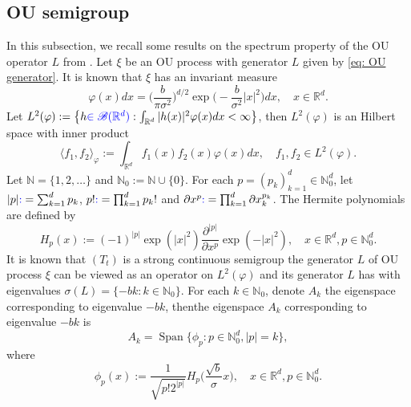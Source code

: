 \documentclass[12pt,oneside,english]{amsart}
\theoremstyle{plain}
\theoremstyle{definition}
\numberwithin{equation}{section}
\newcommand{\added}[1]{{\color{blue}#1}}\newcommand{\deleted}[1]{{\color{red}#1}}
\begin{document}
\subsection{OU semigroup}
    In this subsection, we recall some results on the spectrum property of the OU operator $L$ from \cite{GD}.
    Let $\xi$ be an OU process with generator $L$ given by \eqref{eq: OU generator}.
    It is known that $\xi$ has an invariant measure
\begin{equation}
\label{invariantdensity}
    \varphi(x)dx
    =\Big (\frac{b}{\pi \sigma^2}\Big )^{d/2}\exp \Big(-\frac{b}{\sigma^2}|x|^2 \Big)dx,
    \quad x\in \mathbb{R}^d.
\end{equation}
    Let $L^2(\varphi):= \left\{ h \added{ \in \mathscr B(\mathbb R^d)}: \int_{\mathbb{R}^d} |h(x)|^2 \varphi(x) dx < \infty \right\}$, then $L^2(\varphi)$ is an Hilbert space with inner product
\begin{equation}
    \langle f_1, f_2 \rangle_{\varphi}
    := \int_{\mathbb{R}^d}f_1(x)f_2(x)\varphi(x) dx, \quad f_1,f_2 \in L^2(\varphi).
\end{equation}
    \added{ Let $\mathbb N = \{1,2,\dots\}$ and $\mathbb N_0 := \mathbb N\cup\{0\}$.}
    For each $p = (p_k)_{k = 1}^d \in \mathbb{N}_0^{d}$, let $|p| \added{ :}=\sum_{k=1}^d p_k$, $p! \added{ :}= \prod_{k= 1}^d p_k !$ and $\partial x^p \added{ :}= \prod_{k = 1}^d\partial x_k^{p_k}$.
    The Hermite polynomials are defined by
\begin{equation}
    H_p(x)
    :=(-1)^{|p|}\exp(|x|^2) \frac{\partial ^{|p|}}{\partial x^p} \exp(-|x|^2) ,
    \quad x\in \mathbb R^d, p \in \mathbb{N}_0^{d}.
\end{equation}
    It is known that \added{ $(T_t)$ is a strong continuous semigroup }\deleted{ the generator $L$ of OU process $\xi$ can be viewed as an operator} on $L^2(\varphi)$ \added{ and its generator $L$ has }\deleted{ with} eigenvalues $\sigma(L)= \{-bk: k \in \mathbb N_0\}$.
    For each $k \in \mathbb N_0$, \added{denote $A_k$ the eigenspace corresponding to eigenvalue $-bk$, then}\deleted{the eigenspace $A_k$ corresponding to eigenvalue $-bk$ is}
\begin{equation}
    A_k
    = \operatorname{Span} \{\phi_p : p\in \mathbb N_0^d, |p|=k\},
\end{equation}
where
\begin{equation}\label{eigenfunction}
    \phi_p(x)
    := \frac{1}{\sqrt{ p! 2^{|p|} }} H_p \Big(\frac{ \sqrt{b} }{\sigma}x \Big),
    \quad x\in \mathbb{R}^d, p\in \mathbb N_0^d.
\end{equation}
\end{document}

